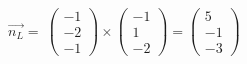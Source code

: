 \documentclass[preview]{standalone}
\begin{document}
\begin{center}
$\vec{n_L} = \:\begin{pmatrix} -1 \\ -2 \\ -1 \end{pmatrix} \times \begin{pmatrix} -1 \\ 1 \\ -2 \end{pmatrix} = \begin{pmatrix} 5 \\ -1 \\ -3 \end{pmatrix}$
\end{center}
\end{document}
